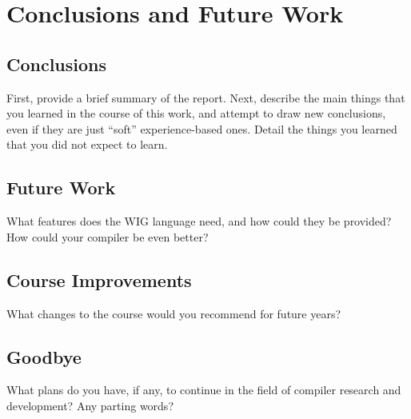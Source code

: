 \documentclass{WigReport}
\begin{document}
\section{Conclusions and Future Work}
\subsection{Conclusions}
First, provide a brief summary of the report.  Next, describe the main
things that you learned in the course of this work, and attempt to
draw new conclusions, even if they are just ``soft'' experience-based
ones.  Detail the things you learned that you did not expect to learn.

\subsection{Future Work}
What features does the WIG language need, and how could they be
provided?  How could your compiler be even better?

\subsection{Course Improvements}
What changes to the course would you recommend for future years?

\subsection{Goodbye}
What plans do you have, if any, to continue in the field of compiler
research and development?  Any parting words?
\end{document}
